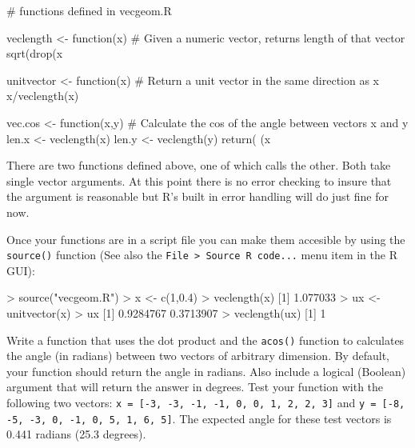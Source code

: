 \begin{R}
# functions defined in vecgeom.R

veclength <- function(x) {
  # Given a numeric vector, returns length of that vector
  sqrt(drop(x %
}

unitvector <- function(x) {
  # Return a unit vector in the same direction as x
  x/veclength(x)
}

vec.cos <- function(x,y) {
  # Calculate the cos of the angle between vectors x and y
  len.x <- veclength(x)
  len.y <- veclength(y)
  return( (x %
}

\end{R}
There are two functions defined above, one of which calls the other.
Both take single vector arguments. At this point there is no error
checking to insure that the argument is reasonable but R's built in
error handling will do just fine for now.

Once your functions are in a script file you can make them accesible by
using the \lstinline!source()! function (See also the
\lstinline!File > Source R code...! menu item in the R GUI):
%
\begin{R}
> source("vecgeom.R")
> x <- c(1,0.4)
> veclength(x)
[1] 1.077033
> ux <- unitvector(x)
> ux
[1] 0.9284767 0.3713907
> veclength(ux)
[1] 1
\end{R}


\begin{assignment}
Write a function that uses the dot product and the \lstinline!acos()! function to calculates the angle (in radians) between two vectors of arbitrary dimension.  By default, your function should return the angle in radians. Also include a logical (Boolean) argument that will return the answer in degrees.  Test your function with the following two vectors: \lstinline!x = [-3, -3, -1, -1, 0, 0, 1, 2, 2, 3]! and
\lstinline!y = [-8, -5, -3, 0, -1, 0, 5, 1, 6, 5]!.  The expected angle for these test vectors is 0.441 radians (25.3 degrees).
\end{assignment}



